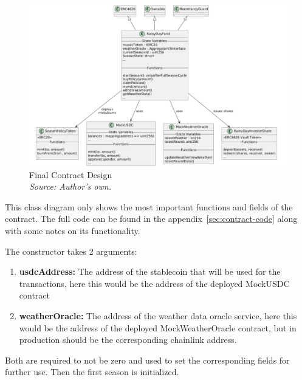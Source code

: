 \documentclass[11pt,a4paper]{article}
\begin{document}
    \begin{figure}[H]
        \centering
        \includegraphics[scale=0.5]{graphics/ClassDiagram_New}
        \caption{Final Contract Design \\ \textit{Source: Author's own.}}
        \label{fig:final-contract-design}
    \end{figure}

    This class diagram only shows the most important functions and fields of the contract.
    The full code can be found in the appendix~\ref{sec:contract-code} along with some notes on its functionality.

    The constructor takes 2 arguments:
    \begin{enumerate}[(1)]
        \item \textbf{usdcAddress:} The address of the stablecoin that will be used for the transactions, here this would be the address of the deployed MockUSDC contract
        \item \textbf{weatherOracle:} The address of the weather data oracle service, here this would be the address of the deployed MockWeatherOracle contract, but in production should be the corresponding chainlink address.
    \end{enumerate}

    Both are required to not be zero and used to set the corresponding fields for further use.
    Then the first season is initialized.
\end{document}
